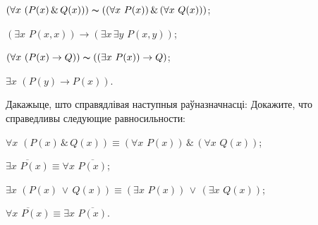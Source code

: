 \begin{problemList}
{\begin{belarusianEnumerate}
\item $(\forall x \,\, (P(x) \,\&\, Q(x))) \thicksim ((\forall x \,\, P(x)) \,\&\, (\forall x \,\, Q(x)))$;
\item $(\exists x \,\, P(x, x)) \to (\exists x \, \exists y \,\, P(x, y))$;
\item $(\forall x \,\, (P(x) \to Q)) \thicksim ((\exists x \,\, P(x)) \to Q)$;
\item $\exists x \,\, (P(y) \to P(x))$.
	
\end{belarusianEnumerate}
}

\bigskip

\problemItemWithCommonPart
{Дакажыце, што справядлівая наступныя раўназначнасці:}
{Докажите, что справедливы следующие равносильности:}
{%
\begin{belarusianEnumerate}
	
\item $\forall x \,\, (P(x) \,\&\, Q(x)) \equiv (\forall x \,\, P(x)) \,\&\, (\forall x \,\, Q(x))$;
\item $\overline{\exists x \,\, P(x)} \equiv \forall x \,\, \overline{P(x)}$;
\item $\exists x \,\, (P(x) \,\vee\, Q(x)) \equiv (\exists x \,\, P(x)) \,\vee\, (\exists x \,\, Q(x))$;
\item $\overline{\forall x \,\, P(x)} \equiv \exists x \,\, \overline{P(x)}$.
	
\end{belarusianEnumerate}
}

\end{problemList}

